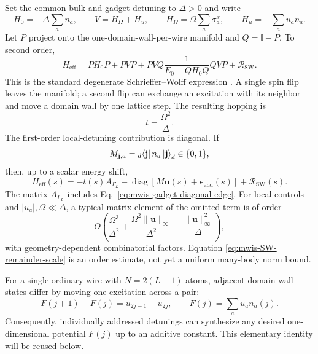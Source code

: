Set the common bulk and gadget detuning to $\Delta>0$ and write
\begin{equation}
 H_0=-\Delta\sum_a n_a,\qquad
 V=H_\Omega+H_u,\qquad
 H_\Omega=\Omega\sum_a\sigma_a^x,\qquad
 H_u=-\sum_a u_a n_a .
 \label{eq:mwis-H0-V}
\end{equation}
Let $P$ project onto the one-domain-wall-per-wire manifold and
$Q=\mathbb I-P$.  To second order,
\begin{equation}
 H_{\mathrm{eff}}
 =PH_0P+PVP
 +PVQ\frac{1}{E_0-QH_0Q}QVP
 +\mathcal R_{\mathrm{SW}} .
 \label{eq:mwis-SW}
\end{equation}
This is the standard degenerate Schrieffer--Wolff expression
\cite{bravyi2011schrieffer}.  A single spin flip leaves the manifold; a second
flip can exchange an excitation with its neighbor and move a domain wall by
one lattice step.  The resulting hopping is
\begin{equation}
 t=\frac{\Omega^2}{\Delta}.
 \label{eq:mwis-hopping}
\end{equation}
The first-order local-detuning contribution is diagonal.  If
\begin{equation}
 M_{\mathbf j,a}={}_d\!\bra{\mathbf j}n_a
 \ket{\mathbf j}_d\in\{0,1\},
 \label{eq:mwis-occupation-map}
\end{equation}
then, up to a scalar energy shift,
\begin{equation}
 H_{\mathrm{eff}}(s)
 =-t(s)A_{\Gamma_L}
 -\operatorname{diag}\!\left[M\mathbf u(s)
 +\boldsymbol\epsilon_{\mathrm{end}}(s)\right]
 +\mathcal R_{\mathrm{SW}}(s).
 \label{eq:mwis-effective-general}
\end{equation}
The matrix $A_{\Gamma_L}$ includes Eq.~\eqref{eq:mwis-gadget-diagonal-edge}.
For local controls and $|u_a|,\Omega\ll\Delta$, a typical matrix element of
the omitted term is of order
\begin{equation}
 O\!\left(\frac{\Omega^3}{\Delta^2}
 +\frac{\Omega^2\|\mathbf u\|_\infty}{\Delta^2}
 +\frac{\|\mathbf u\|_\infty^2}{\Delta}\right),
 \label{eq:mwis-SW-remainder-scale}
\end{equation}
with geometry-dependent combinatorial factors.  Equation
\eqref{eq:mwis-SW-remainder-scale} is an order estimate, not yet a uniform
many-body norm bound.

For a single ordinary wire with $N=2(L-1)$ atoms, adjacent domain-wall states
differ by moving one excitation across a pair:
\begin{equation}
 F(j+1)-F(j)=u_{2j-1}-u_{2j},
 \qquad
 F(j)=\sum_a u_a n_a(j).
 \label{eq:mwis-wire-control-difference}
\end{equation}
Consequently, individually addressed detunings can synthesize any desired
one-dimensional potential $F(j)$ up to an additive constant.  This elementary
identity will be reused below.


